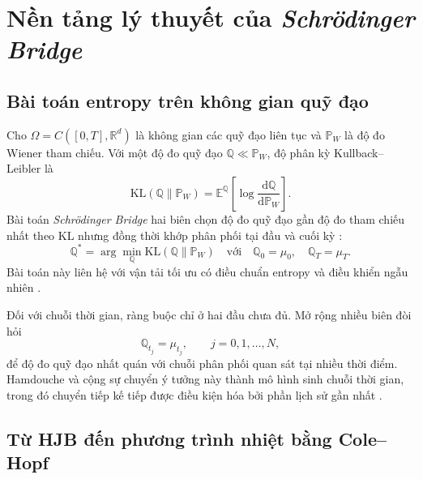 \section{Nền tảng lý thuyết của \textit{Schrödinger Bridge}}
\label{sec:c2-sb-theory}

\subsection{Bài toán entropy trên không gian quỹ đạo}

Cho $\Omega=C([0,T],\mathbb{R}^{d})$ là không gian các quỹ đạo liên tục và
$\mathbb{P}_{W}$ là độ đo Wiener tham chiếu. Với một độ đo quỹ đạo
$\mathbb{Q}\ll\mathbb{P}_{W}$, độ phân kỳ Kullback--Leibler là
\begin{equation}
    \mathrm{KL}(\mathbb{Q}\|\mathbb{P}_{W})
    =\mathbb{E}^{\mathbb{Q}}
    \left[\log\frac{\mathrm{d}\mathbb{Q}}
    {\mathrm{d}\mathbb{P}_{W}}\right].
    \label{eq:c2-path-kl}
\end{equation}
Bài toán \textit{Schrödinger Bridge} hai biên chọn độ đo quỹ đạo gần độ đo tham chiếu nhất
theo KL nhưng đồng thời khớp phân phối tại đầu và cuối kỳ
\parencite{Leonard2014}:
\begin{equation}
    \mathbb{Q}^{*}
    =\arg\min_{\mathbb{Q}}
    \mathrm{KL}(\mathbb{Q}\|\mathbb{P}_{W})
    \quad\text{với}\quad
    \mathbb{Q}_{0}=\mu_0,\quad \mathbb{Q}_{T}=\mu_T.
    \label{eq:c2-classical-sb}
\end{equation}
Bài toán này liên hệ với vận tải tối ưu có điều chuẩn entropy và điều khiển
ngẫu nhiên \parencite{ChenGeorgiouPavon2021}.

Đối với chuỗi thời gian, ràng buộc chỉ ở hai đầu chưa đủ. Mở rộng nhiều biên
đòi hỏi
\begin{equation}
    \mathbb{Q}_{t_j}=\mu_{t_j},
    \qquad j=0,1,\ldots,N,
    \label{eq:c2-multimarginal-sb}
\end{equation}
để độ đo quỹ đạo nhất quán với chuỗi phân phối quan sát tại nhiều thời điểm.
Hamdouche và cộng sự chuyển ý tưởng này thành mô hình sinh chuỗi thời gian,
trong đó chuyển tiếp kế tiếp được điều kiện hóa bởi phần lịch sử gần nhất
\parencite{Hamdouche2023}.

\subsection{Từ HJB đến phương trình nhiệt bằng Cole--Hopf}

